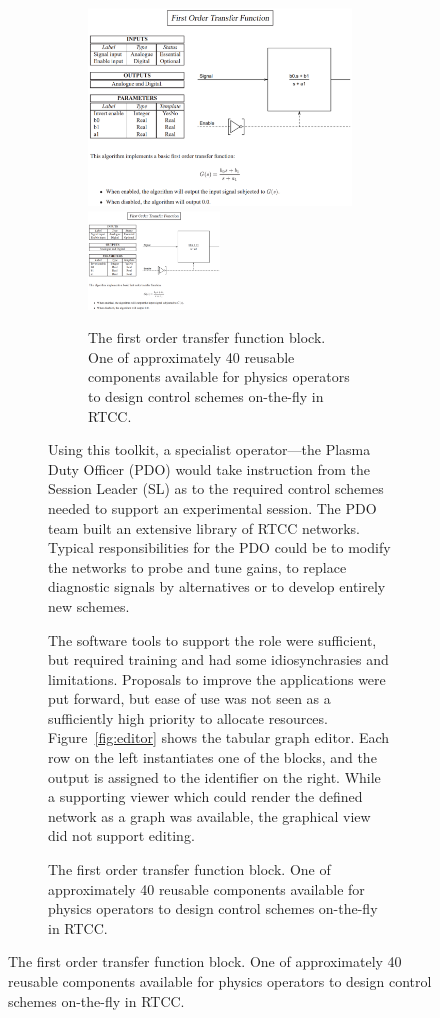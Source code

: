 \documentclass[preprint]{elsarticle}
\begin{document}
\begin{figure}[!p]
\ifpreprint
\begin{figure}[p]
\else
\begin{figure}[ht!]
\fi
\centering
\ifpreprint
\includegraphics[width=1.0\textwidth]{RTCC_TF1_BLOCK.PNG}
\else
\includegraphics[width=0.5\textwidth]{RTCC_TF1_BLOCK.PNG}
\fi
\caption{The first order transfer function block. One of approximately 40 reusable components
	available for physics operators to design control schemes on-the-fly in RTCC.}
\label{fig:tf}
\end{figure}

Using this toolkit, a specialist operator---the Plasma Duty Officer (PDO)
would take instruction from the Session Leader (SL) as to the required
control schemes needed to support an experimental session.
The PDO team built an extensive library of RTCC networks.
Typical responsibilities for the PDO could be to modify the
networks to probe and tune gains, to replace diagnostic
signals by alternatives or to develop entirely new schemes.

The software tools to support the role were sufficient, but
required training and had some idiosynchrasies and limitations.
Proposals to improve the applications were put forward, but
ease of use was not seen as a sufficiently high priority to
allocate resources.  Figure~\ref{fig:editor} shows the tabular
graph editor. Each row on the left instantiates one of the 
blocks, and the output is assigned to the identifier on the right.
While a supporting viewer which could render the defined network
as a graph was available, the graphical view did not support
editing.


\end{figure}
\end{figure}
\end{document}
